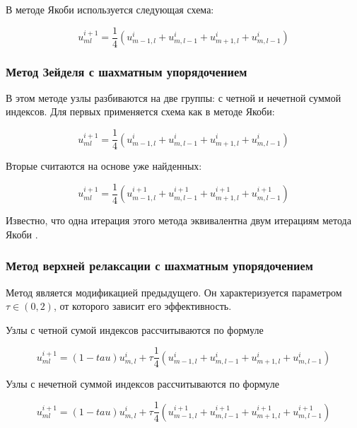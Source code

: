 \documentclass[report , a4paper, onecolumn, 12pt]{article}
\begin{document}
В методе Якоби используется следующая схема:

\begin{equation}
 u^{i + 1}_{ml} = \frac{1}{4} (u^{i}_{m-1, l} + u^{i}_{m, l-1} + u^{i}_{m + 1, l} + u^i_{m, l - 1}) 
\end{equation}

\subsubsection{Метод Зейделя с шахматным упорядочением}

В этом методе узлы разбиваются на две группы: с четной и нечетной суммой индексов. Для первых применяется схема как в методе Якоби:

\begin{equation}
 u^{i + 1}_{ml} = \frac{1}{4} (u^{i}_{m-1, l} + u^{i}_{m, l-1} + u^{i}_{m + 1, l} + u^i_{m, l - 1}) 
\end{equation}

Вторые считаются на основе уже найденных:

\begin{equation}
 u^{i + 1}_{ml} = \frac{1}{4} (u^{i+1}_{m-1, l} + u^{i+1}_{m, l-1} + u^{i+1}_{m + 1, l} + u^{i+1}_{m, l - 1}) 
\end{equation}

Известно, что одна итерация этого метода эквивалентна двум итерациям метода Якоби \cite{aristova}.

\subsubsection{Метод верхней релаксации с шахматным упорядочением}

Метод является модификацией предыдущего. Он характеризуется параметром $\tau\in (0,2)$, от которого зависит его эффективность. 

Узлы с четной сумой индексов рассчитываются по формуле

\begin{equation}
 u^{i + 1}_{ml} = (1-tau) u^{i}_{m,l} + \tau \frac{1}{4} (u^{i}_{m-1, l} + u^{i}_{m, l-1} + u^{i}_{m + 1, l} + u^i_{m, l - 1}) 
\end{equation}

Узлы с нечетной суммой индексов рассчитываются по формуле

\begin{equation}
 u^{i + 1}_{ml} = (1-tau) u^{i}_{m,l} + \tau \frac{1}{4} (u^{i + 1}_{m-1, l} + u^{i + 1}_{m, l-1} + u^{i + 1}_{m + 1, l} + u^{i + 1}_{m, l - 1}) 
\end{equation}
\end{document}
